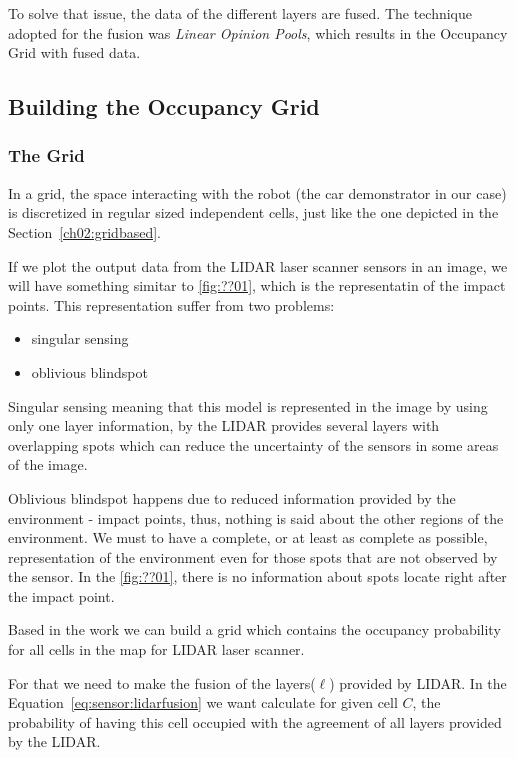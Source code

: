 To solve that issue, the data of the different layers are fused. The technique adopted for the fusion was \textit{Linear Opinion Pools}, which results in the Occupancy Grid with fused data\cite{ADARVE-2012-671211}.

\subsection{Building the Occupancy Grid}


\subsubsection{The Grid}
\label{ch03:buildgrid:grid}

In a grid, the space interacting with the robot (the car demonstrator in our case) is discretized in regular sized independent cells, just like the one depicted in the Section~\ref{ch02:gridbased}.

If we plot the output data from the LIDAR laser scanner sensors in an image, we will have something simitar to \ref{fig:??01}, which is the representatin of the impact points. This representation suffer from two problems:

\begin{itemize}
\item singular sensing
\item oblivious blindspot 
\end{itemize}

Singular sensing meaning that this model is represented in the image by using only one layer information, by the LIDAR provides several layers with overlapping spots which can reduce the uncertainty of the sensors in some areas of the image. 

Oblivious blindspot happens due to reduced information provided by the environment - impact points, thus, nothing is said about the other regions of the environment. We must to have a complete, or at least as complete as possible, representation of the environment even for those spots that are not observed by the sensor. In the \ref{fig:??01}, there is no information about spots locate right after the impact point.

Based in the work \cite{ADARVE-2012-671211} we can build a grid which contains the occupancy probability for all cells in the map for LIDAR laser scanner.

For that we need to make the fusion of the layers($\ell$) provided by LIDAR. In the Equation~\ref{eq:sensor:lidarfusion} we want calculate for given cell $C$, the probability of having this cell occupied with the agreement of all layers provided by the LIDAR.

